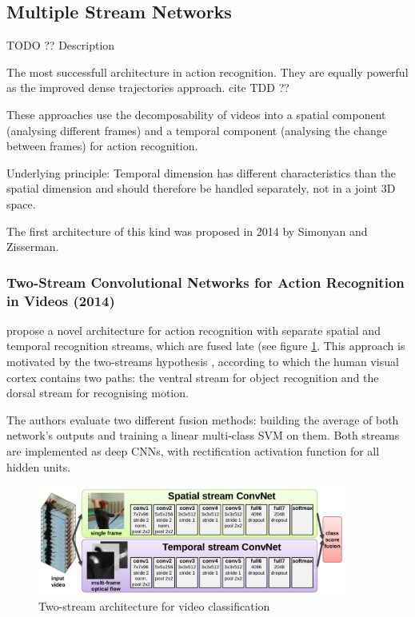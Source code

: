 \newpage
\subsection{Multiple Stream Networks}

TODO ?? Description

The most successfull architecture in action recognition. They are equally powerful as the improved dense trajectories approach. cite TDD ??

These approaches use the decomposability of videos into a spatial component (analysing different frames) and a temporal component (analysing the change between frames) for action recognition.

Underlying principle: Temporal dimension has different characteristics than the spatial dimension and should therefore be handled separately, not in a joint 3D space.

The first architecture of this kind was proposed in 2014 by Simonyan and Zisserman.


\subsubsection{Two-Stream Convolutional Networks for Action Recognition in Videos (2014)}

\textcite{simonyan_two-stream_2014} propose a novel architecture for action recognition with separate spatial and temporal recognition streams, which are fused late (see figure \ref{fig:twostream_architecture}.
This approach is motivated by the two-streams hypothesis \cite{goodale_separate_1992}, according to which the human visual cortex contains two paths: the ventral stream for object recognition and the dorsal stream for recognising motion.

The authors evaluate two different fusion methods: building the average of both network's outputs and training a linear multi-class SVM on them.
Both streams are implemented as deep CNNs, with rectification activation function for all hidden units.

\begin{figure}[H]
    \centering
    \includegraphics[width=0.9\textwidth]{img_deep/twostream_architecture}
    \caption{Two-stream architecture for video classification \cite{simonyan_two-stream_2014}}
    \label{fig:twostream_architecture}
\end{figure}

